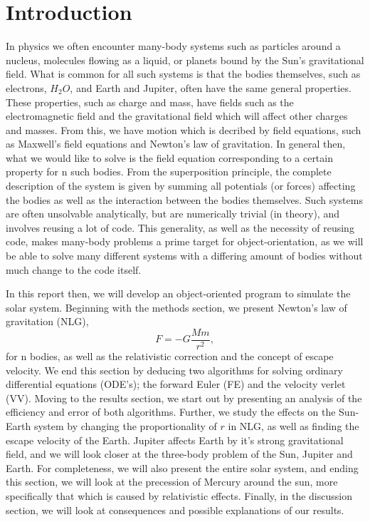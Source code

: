 \section{Introduction}
\label{sec:introduction}

In physics we often encounter many-body systems such as particles around a nucleus,
molecules flowing as a liquid, or planets bound by the Sun's gravitational field.
What is common for all such systems is that the bodies themselves, such as
electrons, $H_2 O$, and Earth and Jupiter, often have the same general properties.
These properties, such as charge and mass, have fields such as the electromagnetic field
and the gravitational field which will affect other charges and masses. From this,
we have motion which is decribed by field equations, such as Maxwell's field equations
and Newton's law of gravitation. In general then, what we would like to solve is
the field equation corresponding to a certain property for n such bodies. From
the superposition principle, the complete description of the system is given by
summing all potentials (or forces) affecting the bodies as well as the interaction
between the bodies themselves. Such systems are often unsolvable analytically, but are
numerically trivial (in theory), and involves reusing a lot of code. This generality,
as well as the necessity of reusing code, makes many-body problems a prime target
for object-orientation, as we will be able to solve many different systems with
a differing amount of bodies without much change to the code itself.

In this report then, we will develop an object-oriented program to simulate the
solar system. Beginning with the methods section, we present Newton's law of gravitation (NLG),
  \begin{equation}
  F = -G\frac{Mm}{r^2},
  \end{equation}
for n bodies, as well as the relativistic correction and the concept of escape velocity.
We end this section by deducing two algorithms for solving ordinary differential equations (ODE's);
the forward Euler (FE) and the velocity verlet (VV). Moving to the results section, we start out
by presenting an analysis of the efficiency and error of both algorithms. Further,
we study the effects on the Sun-Earth system by changing the proportionality of $r$ in NLG,
as well as finding the escape velocity of the Earth. Jupiter affects Earth by it's strong gravitational field,
and we will look closer at the three-body problem of the Sun, Jupiter and Earth. For completeness,
we will also present the entire solar system, and ending this section, we will
look at the precession of Mercury around the sun, more specifically that which is caused by relativistic effects. Finally, in the discussion section, we will look at consequences and possible explanations of our results.
